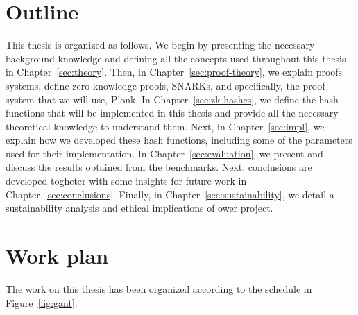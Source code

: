 \section{Outline}
This thesis is organized as follows. We begin by presenting the necessary background knowledge and defining all the concepts used throughout this thesis in Chapter~\ref{sec:theory}. Then, in Chapter~\ref{sec:proof-theory}, we explain proofs systems, define zero-knowledge proofs, SNARKs, and specifically, the proof system that we will use, Plonk. In Chapter~\ref{sec:zk-hashes}, we define the hash functions that will be implemented in this thesis and provide all the necessary theoretical knowledge to understand them. Next, in Chapter~\ref{sec:impl}, we explain how we developed these hash functions, including some of the parameters used for their implementation. In Chapter~\ref{sec:evaluation}, we present and discuss the results obtained from the benchmarks. Next, conclusions are developed togheter with some insights for future work in Chapter~\ref{sec:conclusions}. Finally, in Chapter~\ref{sec:sustainability}, we detail a sustainability analysis and ethical implications of ower project.

\section{Work plan}
The work on this thesis has been organized according to the schedule in Figure~\ref{fig:gant}.

